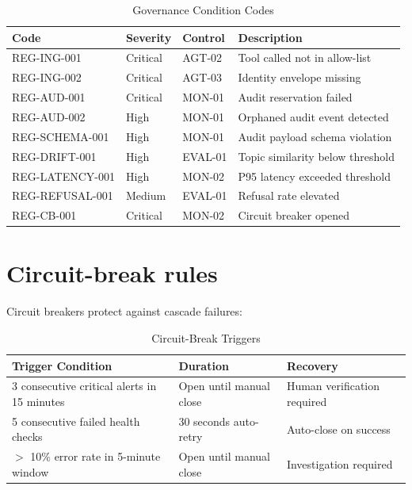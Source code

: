 \begin{table}[htbp]
\centering
\footnotesize
\caption{Governance Condition Codes}
\label{tab:condition-codes}
\begin{tabularx}{\textwidth}{@{}l l l X@{}}
\toprule
\textbf{Code} & \textbf{Severity} & \textbf{Control} & \textbf{Description} \\
\midrule
REG-ING-001 & Critical & AGT-02 & Tool called not in allow-list \\
REG-ING-002 & Critical & AGT-03 & Identity envelope missing \\
REG-AUD-001 & Critical & MON-01 & Audit reservation failed \\
REG-AUD-002 & High & MON-01 & Orphaned audit event detected \\
REG-SCHEMA-001 & High & MON-01 & Audit payload schema violation \\
REG-DRIFT-001 & High & EVAL-01 & Topic similarity below threshold \\
REG-LATENCY-001 & High & MON-02 & P95 latency exceeded threshold \\
REG-REFUSAL-001 & Medium & EVAL-01 & Refusal rate elevated \\
REG-CB-001 & Critical & MON-02 & Circuit breaker opened \\
\bottomrule
\end{tabularx}
\end{table}

\section{Circuit-break rules}

Circuit breakers protect against cascade failures:

\begin{table}[htbp]
\centering
\caption{Circuit-Break Triggers}
\label{tab:circuit-break}
\begin{tabularx}{\textwidth}{@{}X l l@{}}
\toprule
\textbf{Trigger Condition} & \textbf{Duration} & \textbf{Recovery} \\
\midrule
3 consecutive critical alerts in 15 minutes & Open until manual close & Human verification required \\
5 consecutive failed health checks & 30 seconds auto-retry & Auto-close on success \\
$>$ 10\% error rate in 5-minute window & Open until manual close & Investigation required \\
\bottomrule
\end{tabularx}
\end{table}

